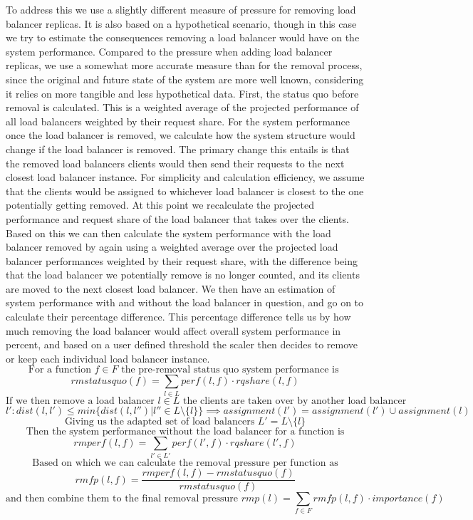 To address this we use a slightly different measure of pressure for removing load balancer replicas.
It is also based on a hypothetical scenario, though in this case we try to estimate the consequences removing a load balancer would have on the system performance.
Compared to the pressure when adding load balancer replicas, we use a somewhat more accurate measure than for the removal process, since the original and future state of the system are more well known, considering it relies on more tangible and less hypothetical data.
First, the status quo before removal is calculated.
This is a weighted average of the projected performance of all load balancers weighted by their request share.
For the system performance once the load balancer is removed, we calculate how the system structure would change if the load balancer is removed.
The primary change this entails is that the removed load balancers clients would then send their requests to the next closest load balancer instance.
For simplicity and calculation efficiency, we assume that the clients would be assigned to whichever load balancer is closest to the one potentially getting removed.
At this point we recalculate the projected performance and request share of the load balancer that takes over the clients.
Based on this we can then calculate the system performance with the load balancer removed by again using a weighted average over the projected load balancer performances weighted by their request share, with the difference being that the load balancer we potentially remove is no longer counted, and its clients are moved to the next closest load balancer.
We then have an estimation of system performance with and without the load balancer in question, and go on to calculate their percentage difference.
This percentage difference tells us by how much removing the load balancer would affect overall system performance in percent, and based on a user defined threshold the scaler then decides to remove or keep each individual load balancer instance.
\[\text{For a function }f \in F \text{ the pre-removal status quo system performance is }\]
\[rmstatusquo(f) = \sum_{l \in L}perf(l,f) \cdot rqshare(l,f)\]
\[\text{If we then remove a load balancer }l \in L \text{ the clients are taken over by another load balancer} \]
\[l': dist(l,l') \leq min\{dist(l,l'') | l'' \in L \setminus \{l\}\} \implies assignment(l') = assignment(l') \cup assignment(l)\]
\[\text{Giving us the adapted set of load balancers }L' = L \setminus \{l\} \]
\[\text{Then the system performance without the load balancer for a function is} \]
\[rmperf(l,f) = \sum_{l' \in L'}perf(l',f) \cdot rqshare(l',f) \]
\[\text{Based on which we can calculate the removal pressure per function as}\]
\[ rmfp(l,f) = \frac{rmperf(l,f) - rmstatusquo(f)}{rmstatusquo(f)}\]
\[\text{and then combine them to the final removal pressure } rmp(l) = \sum_{f \in F}rmfp(l,f) \cdot importance(f)\]

